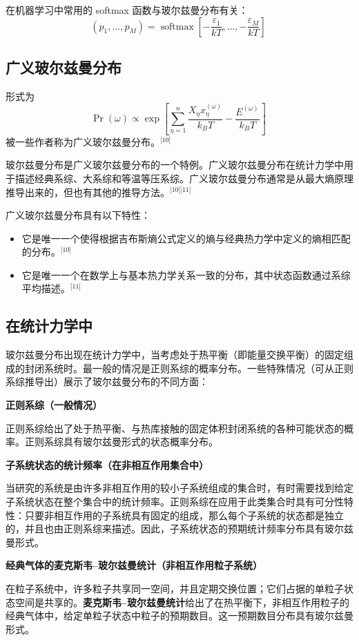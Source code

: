 在机器学习中常用的 softmax 函数与玻尔兹曼分布有关：
\[
(p_1, \ldots, p_M) = \operatorname{softmax} \left[ -\frac{\varepsilon_1}{kT}, \ldots, -\frac{\varepsilon_M}{kT} \right]~
\]
\subsection{广义玻尔兹曼分布}
形式为
\[
\Pr \left(\omega \right) \propto \exp \left[ \sum_{\eta =1}^{n} \frac{X_{\eta} x_{\eta}^{(\omega)}}{k_B T} - \frac{E^{(\omega)}}{k_B T} \right]~
\]
被一些作者称为广义玻尔兹曼分布。\(^\text{[10]}\)

玻尔兹曼分布是广义玻尔兹曼分布的一个特例。广义玻尔兹曼分布在统计力学中用于描述经典系综、大系综和等温等压系综。广义玻尔兹曼分布通常是从最大熵原理推导出来的，但也有其他的推导方法。\(^\text{[10][11]}\)

广义玻尔兹曼分布具有以下特性：
\begin{itemize}
\item 它是唯一一个使得根据吉布斯熵公式定义的熵与经典热力学中定义的熵相匹配的分布。\(^\text{[10]}\)
\item 它是唯一一个在数学上与基本热力学关系一致的分布，其中状态函数通过系综平均描述。\(^\text{[11]}\)
\end{itemize}
\subsection{在统计力学中}  
玻尔兹曼分布出现在统计力学中，当考虑处于热平衡（即能量交换平衡）的固定组成的封闭系统时。最一般的情况是正则系综的概率分布。一些特殊情况（可从正则系综推导出）展示了玻尔兹曼分布的不同方面：

\textbf{正则系综（一般情况）}  

正则系综给出了处于热平衡、与热库接触的固定体积封闭系统的各种可能状态的概率。正则系综具有玻尔兹曼形式的状态概率分布。  

\textbf{子系统状态的统计频率（在非相互作用集合中）}  

当研究的系统是由许多非相互作用的较小子系统组成的集合时，有时需要找到给定子系统状态在整个集合中的统计频率。正则系综在应用于此类集合时具有可分性特性：只要非相互作用的子系统具有固定的组成，那么每个子系统的状态都是独立的，并且也由正则系综来描述。因此，子系统状态的预期统计频率分布具有玻尔兹曼形式。  

\textbf{经典气体的麦克斯韦–玻尔兹曼统计（非相互作用粒子系统）}  

在粒子系统中，许多粒子共享同一空间，并且定期交换位置；它们占据的单粒子状态空间是共享的。\textbf{麦克斯韦–玻尔兹曼统计}给出了在热平衡下，非相互作用粒子的经典气体中，给定单粒子状态中粒子的预期数目。这一预期数目分布具有玻尔兹曼形式。

